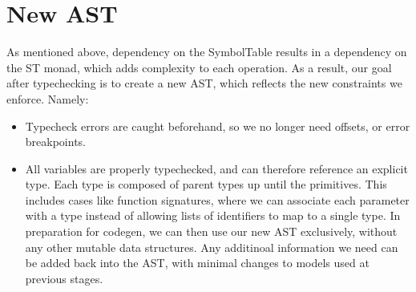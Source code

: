 \documentclass[11pt]{article}
\begin{document}
\section{New AST}
\label{sec:org65e7260}
As mentioned above, dependency on the SymbolTable results in a
dependency on the ST monad, which adds complexity to each operation.
As a result, our goal after typechecking is to create a new AST,
which reflects the new constraints we enforce.  Namely:
\begin{itemize}
\item Typecheck errors are caught beforehand, so we no longer need offsets,
or error breakpoints.
\item All variables are properly typechecked, and can therefore reference an 
explicit type. Each type is composed of parent types up until
the primitives.  This includes cases like function signatures,
where we can associate each parameter with a type instead of
allowing lists of identifiers to map to a single type.  In
preparation for codegen, we can then use our new AST
exclusively, without any other mutable data structures. Any
additinoal information we need can be added back into the AST,
with minimal changes to models used at previous stages.
\end{itemize}
\end{document}
